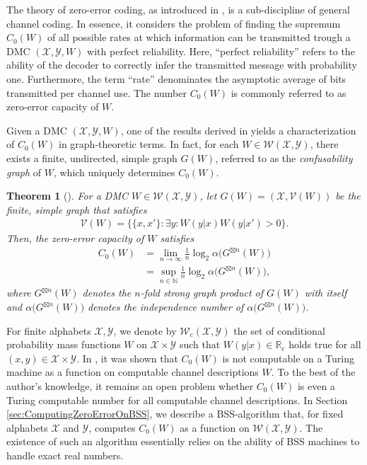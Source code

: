 \documentclass[conference]{IEEEtran}
\def\X{{\mathcal X}}
\def\Y{{\mathcal Y}}
\def\V{{\mathcal V}}
\def\W{{\mathcal W}}
\def\NN{{\mathbb N}}
\def\RR{{\mathbb R}}
\newcommand{\RRc}{\RR_{\mathrm{c}}}
\newcommand{\Wc}{\W_{\mathrm{c}}}
\newtheorem{Theorem}{Theorem}
\begin{document}
	The theory of zero-error coding, as introduced in \cite{Sh56}, is a sub-discipline of general channel coding. In essence, it considers the problem of finding the supremum 
	\(C_0(W)\) of all possible rates at which information can be transmitted trough a DMC \((\X,\Y,W)\) with perfect reliability. Here, ``perfect reliability'' refers
	to the ability of the decoder to correctly infer the transmitted message with probability one. Furthermore, the term ``rate'' denominates the asymptotic average of bits transmitted per channel use. 
	The number \(C_0(W)\) is commonly referred to as zero-error capacity of \(W\).

	Given a DMC \((\X,\Y,W)\), one of the results derived in \cite{Sh56} yields a characterization of \(C_0(W)\) in graph-theoretic terms.
	In fact, for each \(W\in \W(\X,\Y)\), there exists a finite, undirected, simple graph \(G(W)\), referred to as the \emph{confusability graph} of \(W\), which
	uniquely determines \(C_0(W)\).

	\begin{Theorem}	[\cite{Sh56}]\label{thm:ZE_Capacity}
					For a DMC \(W\in\W(\X,\Y)\), let \(G(W) = (\X, \V(W))\) be the finite, simple graph that satisfies
					\begin{align*}   \V(W) = \big\{\{x,x'\} : \exists y : W(y|x)W(y|x') > 0\big\}.
					\end{align*}
					Then, the zero-error capacity of \(W\) satisfies
					\begin{align*}   C_0(W)  	&=  \lim_{n\to\infty} \frac{1}{n} \log_2 \alpha\big(G^{\boxtimes n }(W)\big) \\
												&=  \sup_{n\in\NN} \frac{1}{n} \log_2 \alpha\big(G^{\boxtimes n }(W)\big),
					\end{align*}
					where \(G^{\boxtimes n }(W)\) denotes the \(n\)-fold \emph{strong graph product} of \(G(W)\) with itself and
					\(\alpha\big(G^{\boxtimes n }(W)\big)\) denotes the \emph{independence number} of \(\alpha\big(G^{\boxtimes n }(W)\big)\).
	\end{Theorem}
	
	For finite alphabets \(\X,\Y\), we denote by \(\Wc(\X,\Y)\) the set of conditional probability mass functions \(W\) on \(\X\times\Y\) such that \(W(y|x) \in \RRc\) 
	holds true for all \((x,y) \in \X\times \Y\). In \cite{BD20Z}, it was shown that \(C_0(W)\) is not computable on a Turing machine as a function on computable channel descriptions \(W\).
	To the best of the author's knowledge, it remains an open problem whether \(C_0(W)\) is even a Turing computable number for all computable channel descriptions.
	In Section \ref{sec:ComputingZeroErrorOnBSS}, we describe a BSS-algorithm that, for fixed alphabets \(\X\) and \(\Y\), computes \(C_0(W)\) as a function on \(\W(\X,\Y)\). The existence 
	of such an algorithm essentially relies on the ability of BSS machines to handle exact real numbers.
\end{document}
